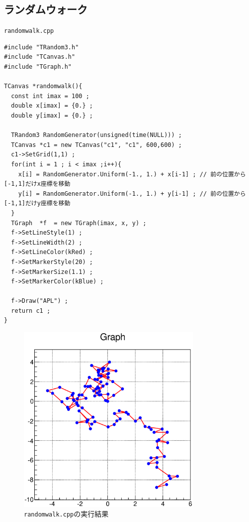 \subsection{ランダムウォーク}
 \begin{itembox}{\texttt{randomwalk.cpp}}
\begin{verbatim}
#include "TRandom3.h"
#include "TCanvas.h"
#include "TGraph.h"

TCanvas *randomwalk(){
  const int imax = 100 ;
  double x[imax] = {0.} ;
  double y[imax] = {0.} ;

  TRandom3 RandomGenerator(unsigned(time(NULL))) ;
  TCanvas *c1 = new TCanvas("c1", "c1", 600,600) ;
  c1->SetGrid(1,1) ;  
  for(int i = 1 ; i < imax ;i++){
    x[i] = RandomGenerator.Uniform(-1., 1.) + x[i-1] ; // 前の位置から[-1,1]だけx座標を移動
    y[i] = RandomGenerator.Uniform(-1., 1.) + y[i-1] ; // 前の位置から[-1,1]だけy座標を移動
  }
  TGraph  *f  = new TGraph(imax, x, y) ;
  f->SetLineStyle(1) ;
  f->SetLineWidth(2) ;
  f->SetLineColor(kRed) ;
  f->SetMarkerStyle(20) ;
  f->SetMarkerSize(1.1) ;
  f->SetMarkerColor(kBlue) ;

  f->Draw("APL") ;
  return c1 ;
}
\end{verbatim}
  \end{itembox}
 \begin{figure}[htbp]
  \begin{center}
   \includegraphics[width = 90mm]{./picture/randomwalkcanvas1.eps}
  \end{center}
  \caption{\texttt{randomwalk.cpp}の実行結果}
  \label{Fig:randomwalkcanvas1}
 \end{figure}

